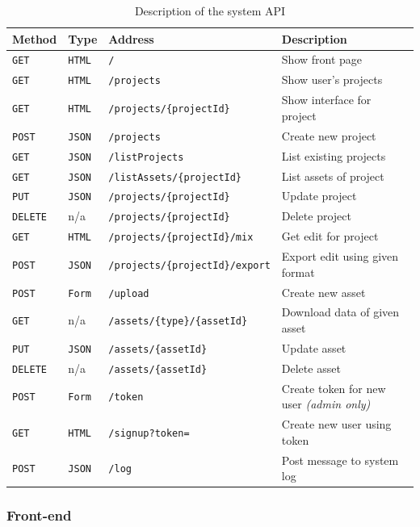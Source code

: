 \begin{table}[ht]
\begin{tabular}{ l l l l }
Method & Type & Address & Description \\
\hline
\texttt{GET}    & \texttt{HTML} & \texttt{/} & Show front page \\ 
\texttt{GET}    & \texttt{HTML} & \texttt{/projects} & Show user's projects \\ 
\texttt{GET}    & \texttt{HTML} & \texttt{/projects/\{projectId\}} & Show
interface for project \\
\texttt{POST}   & \texttt{JSON} & \texttt{/projects} & Create new project \\
\texttt{GET}    & \texttt{JSON} & \texttt{/listProjects} & List existing
projects \\
\texttt{GET}    & \texttt{JSON} & \texttt{/listAssets/\{projectId\}} & List
assets of project \\
\texttt{PUT}    & \texttt{JSON} & \texttt{/projects/\{projectId\}} & Update
project \\
\texttt{DELETE} & n/a           & \texttt{/projects/\{projectId\}} & Delete
project \\
\texttt{GET}    & \texttt{HTML} & \texttt{/projects/\{projectId\}/mix} & Get
edit for project \\
\texttt{POST}   & \texttt{JSON} & \texttt{/projects/\{projectId\}/export} &
Export edit using given format \\
\texttt{POST}   & \texttt{Form} &\texttt{/upload} & Create new asset \\
\texttt{GET}    & n/a           & \texttt{/assets/\{type\}/\{assetId\}} &
Download data of given asset \\
\texttt{PUT}    & \texttt{JSON} & \texttt{/assets/\{assetId\}} & Update asset \\
\texttt{DELETE} & n/a           & \texttt{/assets/\{assetId\}} & Delete asset \\
\texttt{POST}   & \texttt{Form} & \texttt{/token} & Create token for new user
\textit{(admin only)} \\
\texttt{GET}    & \texttt{HTML} & \texttt{/signup?token=} & Create new user
using token \\
\texttt{POST}   & \texttt{JSON} & \texttt{/log} & Post message to system log \\
\end{tabular}
\caption{Description of the system API}
\end{table}


\subsubsection{Front-end}
